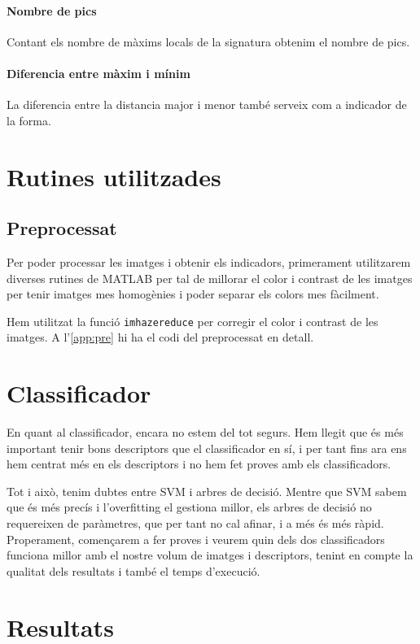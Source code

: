 \paragraph{Nombre de pics} Contant els nombre de màxims locals de la signatura obtenim el nombre de pics.

\paragraph{Diferencia entre màxim i mínim} La diferencia entre la distancia major i menor també serveix com a indicador de la forma.

\section{Rutines utilitzades}

\subsection{Preprocessat}

Per poder processar les imatges i obtenir els indicadors, primerament utilitzarem 
diverses rutines de MATLAB per tal de millorar el color i contrast de les imatges per tenir
imatges mes homogènies i poder separar els colors mes fàcilment.

Hem utilitzat la funció \texttt{imhazereduce} per corregir el color i contrast de les imatges.
A l'\cref{app:pre} hi ha el codi del preprocessat en detall.




\section{Classificador}%
\label{sec:classificador}

En quant al classificador, encara no estem del tot segurs. Hem llegit que és més
important tenir bons descriptors que el classificador en sí, i per tant fins
ara ens hem centrat més en els descriptors i no hem fet proves amb els 
classificadors. 

Tot i això, tenim dubtes entre SVM i arbres de decisió. Mentre que SVM sabem que és més precís i l'overfitting el gestiona millor, els arbres de decisió no
requereixen de paràmetres, que per tant no cal afinar, i a més és més ràpid.
Properament, començarem a fer proves i veurem quin dels dos classificadors
funciona millor amb el nostre volum de imatges i descriptors, tenint en compte
la qualitat dels resultats i també el temps d'execució.

\section{Resultats}%
\label{sec:resultats}